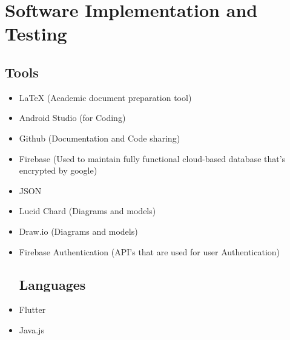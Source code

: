 \documentclass[12pt]{article}
\begin{document}
\section{Software Implementation and Testing}
\subsection{Tools}
\begin{itemize}
  \item  LaTeX (Academic document preparation tool) 
  \item  Android Studio (for Coding)
  \item  Github (Documentation and Code sharing)
  \item  Firebase (Used to maintain fully functional cloud-based database that's encrypted by google)
  \item  JSON
  \item  Lucid Chard (Diagrams and models)
  \item  Draw.io (Diagrams and models)
  \item  Firebase Authentication (API's that are used for user Authentication) 
\subsection{Languages}
\item Flutter
\item Java.js
\end{itemize}
\end{document}
